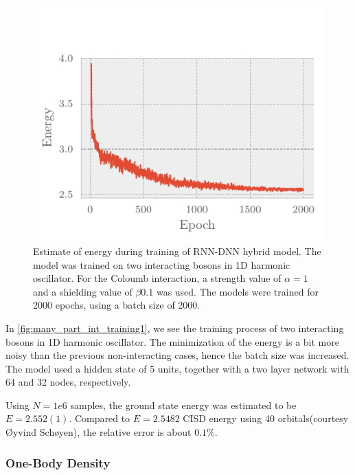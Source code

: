 \begin{figure}[H]
	\includegraphics[]{figures/many_part_int_training1.pdf}
	\caption{Estimate of energy during training of RNN-DNN hybrid model. The model was trained on two interacting bosons in 1D harmonic oscillator. For the Coloumb interaction, a strength value of $\alpha = 1$ and a shielding value of $\beta 0.1$ was used. The models were trained for 2000 epochs, using a batch size of 2000.}
	\label{fig:many_part_int_training1}
\end{figure}

In \autoref{fig:many_part_int_training1}, we see the training process of two interacting bosons in 1D harmonic oscillator. The minimization of the energy is a bit more noisy than the previous non-interacting cases, hence the batch size was increased. The model used a hidden state of 5 units, together with a two layer network with 64 and 32 nodes, respectively.

Using $N=1e6$ samples, the ground state energy was estimated to be $E = 2.552(1)$. Compared to $E = 2.5482$ CISD energy using 40 orbitals(courtesy Øyvind Schøyen), the relative error is about $0.1\%$.

\subsubsection{One-Body Density}

